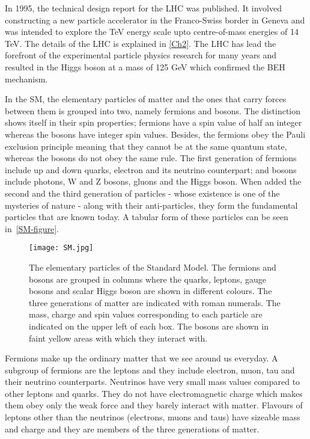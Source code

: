 In 1995, the technical design report for the LHC was published\cite{lhc-tdr}. It involved constructing a new particle accelerator in the Franco-Swiss border in Geneva and was intended to explore the TeV energy scale upto centre-of-mass energies of 14 TeV. The details of the LHC is explained in \autoref{Ch2}. The LHC has lead the forefront of the experimental particle physics research for many years and resulted in the Higgs boson at a mass of 125 GeV which confirmed the BEH mechanism.

In the SM, the elementary particles of matter and the ones that carry forces between them is grouped into two, namely fermions and bosons. The distinction shows itself in their spin properties; fermions have a spin value of half an integer whereas the bosons have integer spin values. Besides, the fermions obey the Pauli exclusion principle meaning that they cannot be at the same quantum state, whereas the bosons do not obey the same rule. The first generation of fermions include up and down quarks, electron and its neutrino counterpart; and bosons include photons, W and Z bosons, gluons and the Higgs boson. When added the second and the third generation of particles - whose existence is one of the mysteries of nature - along with their anti-particles, they form the fundamental particles that are known today. A tabular form of these particles can be seen in~\autoref{SM-figure}.

\vspace{6pt}
\begin{figure}[ht]
	\centering
	\texttt{[image: SM.jpg]}
	\vspace{6pt}
	\caption{The elementary particles of the Standard Model. The fermions and bosons are grouped in columns where the quarks, leptons, gauge bosons and scalar Higgs boson are shown in different colours. The three generations of matter are indicated with roman numerals. The mass, charge and spin values corresponding to each particle are indicated on the upper left of each box. The bosons are shown in faint yellow areas with which they interact with.}
	\label{SM-figure}
\end{figure}

Fermions make up the ordinary matter that we see around us everyday. A subgroup of fermions are the leptons and they include electron, muon, tau and their neutrino counterparts. Neutrinos have very small mass values compared to other leptons and quarks. They do not have electromagnetic charge which makes them obey only the weak force and they barely interact with matter. Flavours of leptons other than the neutrinos (electrons, muons and taus) have sizeable mass and charge and they are members of the three generations of matter.

